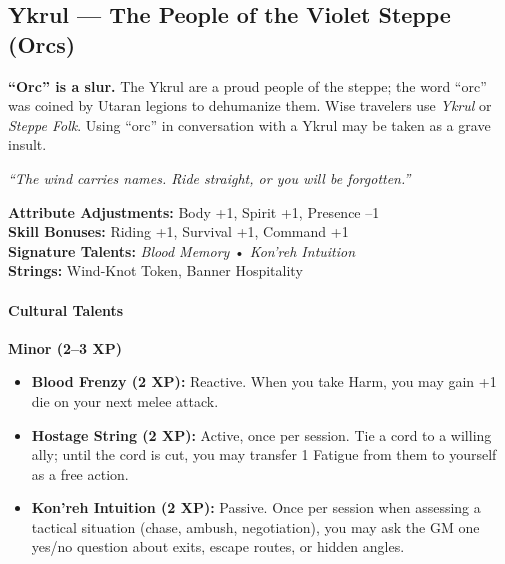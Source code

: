 \clearpage

\subsection{Ykrul --- The People of the Violet Steppe (Orcs)}
\label{sec:ykrul-detailed}

\begin{tcolorbox}[colback=red!5!white,colframe=red!75!black,title=Note on Naming,breakable]
\textbf{``Orc'' is a slur.} The Ykrul are a proud people of the steppe; the word ``orc'' was coined by Utaran legions to dehumanize them. Wise travelers use \emph{Ykrul} or \emph{Steppe Folk}. Using ``orc'' in conversation with a Ykrul may be taken as a grave insult.
\end{tcolorbox}

\emph{``The wind carries names. Ride straight, or you will be forgotten.''}

\begin{tcolorbox}[colback=black!3!white,colframe=black!40!white,title=Ykrul at a Glance,breakable]
\textbf{Attribute Adjustments:} Body +1, Spirit +1, Presence --1 \\
\textbf{Skill Bonuses:} Riding +1, Survival +1, Command +1 \\
\textbf{Signature Talents:} \emph{Blood Memory} • \emph{Kon'reh Intuition} \\
\textbf{Strings:} Wind-Knot Token, Banner Hospitality
\end{tcolorbox}

\paragraph{Cultural Talents}

\textbf{Minor (2--3 XP)}
\begin{itemize}
  \item \textbf{Blood Frenzy (2 XP):} Reactive. When you take Harm, you may gain +1 die on your next melee attack.
  \item \textbf{Hostage String (2 XP):} Active, once per session. Tie a cord to a willing ally; until the cord is cut, you may transfer 1 Fatigue from them to yourself as a free action.
  \item \textbf{Kon'reh Intuition (2 XP):} Passive. Once per session when assessing a tactical situation (chase, ambush, negotiation), you may ask the GM one yes/no question about exits, escape routes, or hidden angles.
\end{itemize}

